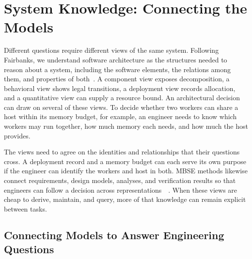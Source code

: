 


\chapter{System Knowledge: Connecting the Models}


Different questions require different views of the same system. Following Fairbanks, we understand software architecture as the structures needed to reason about a system, including the software elements, the relations among them, and properties of both~\citep{fairbanks2010}. A component view exposes decomposition, a behavioral view shows legal transitions, a deployment view records allocation, and a quantitative view can supply a resource bound. An architectural decision can draw on several of these views. To decide whether two workers can share a host within its memory budget, for example, an engineer needs to know which workers may run together, how much memory each needs, and how much the host provides.

The views need to agree on the identities and relationships that their questions cross. A deployment record and a memory budget can each serve its own purpose if the engineer can identify the workers and host in both. MBSE methods likewise connect requirements, design models, analyses, and verification results so that engineers can follow a decision across representations~\citep{estefan2008mbse}~\citep{madni2018mbse}. When these views are cheap to derive, maintain, and query, more of that knowledge can remain explicit between tasks.

\section{Connecting Models to Answer Engineering Questions}\label{heading:connecting-models-to-answer-engineering-questions}


